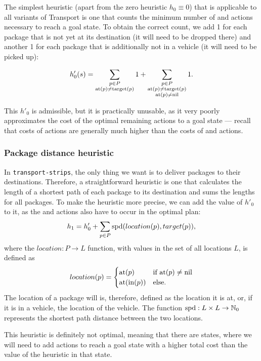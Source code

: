 The simplest heuristic (apart from the zero heuristic $h_0 \equiv 0$) that is applicable to all variants of Transport
is one that counts the minimum number of \pickup{} and \drop{} actions
necessary to reach a goal state.
To obtain the correct count, we add 1 for each
package that is not yet at its destination (it will need to be dropped there) and another 1 for each package
that is additionally not in a vehicle (it will need to be picked up):

$$h'_{0}(s) = \sum_{\substack{
p \in P\\ \textrm{at}(p) \neq \textrm{target}(p)}} 1
+ \sum_{\substack{
p \in P\\ \textrm{at}(p) \neq \textrm{target}(p)\\
\textrm{at}(p) \neq \textrm{nil}}} 1.$$

This $h'_0$ is admissible, but it is practically unusable, as it
very poorly approximates 
the cost of the optimal remaining actions to a goal state
--- recall that costs of \drive{} actions are generally much higher than the costs of \pickup{} and \drop{} actions.

\subsubsection{Package distance heuristic}\label{sfa1}

In \texttt{transport-strips}, the only thing we want is to deliver packages to their destinations. Therefore, a straightforward heuristic is one that calculates the length of a shortest
path of each package to its destination and sums the lengths for all packages.
To make the heuristic more precise, we can add the
value of $h'_0$ to it, as the \pickup{} and \drop{}
actions also have to occur in the optimal plan:
$$h_1 = h'_0 + \sum_{p \in P} \textrm{spd}(location(p), target(p)),$$
where the $location: P \to L$ function,
with values in the set of all locations $L$, is defined as
$$location(p) = \begin{cases} 
   \textrm{at}(p) & \text{if } \textrm{at}(p) \neq \textrm{nil}\\
   \textrm{at}(\textrm{in}(p)) & \text{else}.
  \end{cases}$$
The location of a package will is, therefore, defined
as the location it is at, or, if it is in a vehicle,
the location of the vehicle.
The function $\textrm{spd}: L \times L \to \mathbb{N}_0$ represents
the shortest path distance between the two locations.

This heuristic is definitely not optimal, meaning that there are states,
where we will need to add actions to reach a goal state with a higher total cost than the value of the heuristic in that state.

